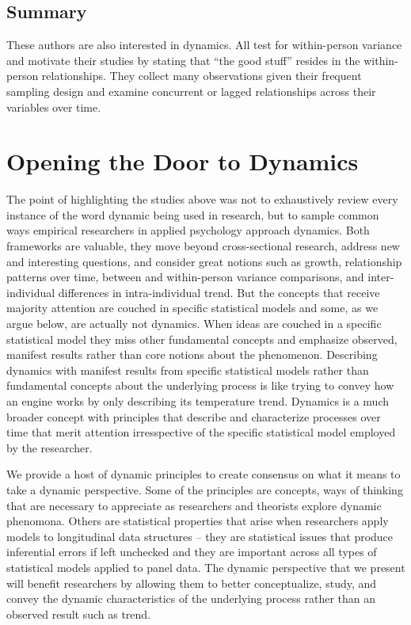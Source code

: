 \documentclass[english,,man]{apa6}
\theoremstyle{definition}
\theoremstyle{definition}
\theoremstyle{definition}
\theoremstyle{remark}
\begin{document}
\hypertarget{summary-1}{%
\subsection{Summary}\label{summary-1}}

These authors are also interested in dynamics. All test for
within-person variance and motivate their studies by stating that
\enquote{the good stuff} resides in the within-person relationships.
They collect many observations given their frequent sampling design and
examine concurrent or lagged relationships across their variables over
time.

\hypertarget{opening-the-door-to-dynamics}{%
\section{Opening the Door to
Dynamics}\label{opening-the-door-to-dynamics}}

The point of highlighting the studies above was not to exhaustively
review every instance of the word dynamic being used in research, but to
sample common ways empirical researchers in applied psychology approach
dynamics. Both frameworks are valuable, they move beyond cross-sectional
research, address new and interesting questions, and consider great
notions such as growth, relationship patterns over time, between and
within-person variance comparisons, and inter-individual differences in
intra-individual trend. But the concepts that receive majority attention
are couched in specific statistical models and some, as we argue below,
are actually not dynamics. When ideas are couched in a specific
statistical model they miss other fundamental concepts and emphasize
observed, manifest results rather than core notions about the
phenomenon. Describing dynamics with manifest results from specific
statistical models rather than fundamental concepts about the underlying
process is like trying to convey how an engine works by only describing
its temperature trend. Dynamics is a much broader concept with
principles that describe and characterize processes over time that merit
attention irresspective of the specific statistical model employed by
the researcher.

We provide a host of dynamic principles to create consensus on what it
means to take a dynamic perspective. Some of the principles are
concepts, ways of thinking that are necessary to appreciate as
researchers and theorists explore dynamic phenomona. Others are
statistical properties that arise when researchers apply models to
longitudinal data structures -- they are statistical issues that produce
inferential errors if left unchecked and they are important across all
types of statistical models applied to panel data. The dynamic
perspective that we present will benefit researchers by allowing them to
better conceptualize, study, and convey the dynamic characteristics of
the underlying process rather than an observed result such as trend.
\end{document}
